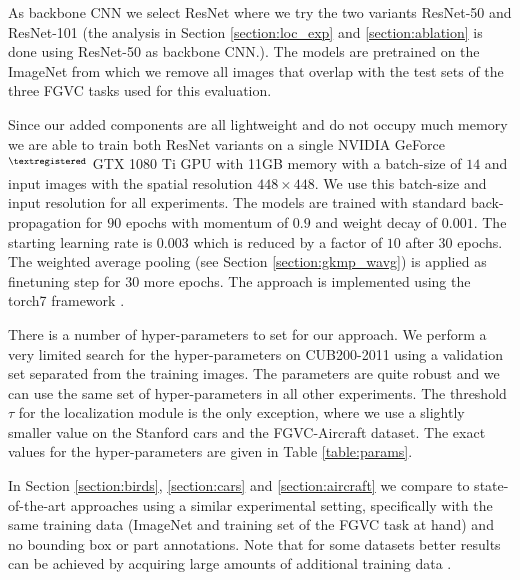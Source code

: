 \documentclass[10pt,twocolumn,letterpaper]{article}
\begin{document}
As backbone CNN we select ResNet \cite{he2016deep} where we try the two variants ResNet-50 and ResNet-101 (the analysis in Section \ref{section:loc_exp} and \ref{section:ablation} is done using ResNet-50 as backbone CNN.). The models are pretrained on the ImageNet \cite{deng2009imagenet} from which we remove all images that overlap with the test sets of the three FGVC tasks used for this evaluation.

Since our added components are all lightweight and do not occupy much memory we are able to train both ResNet variants on a single NVIDIA GeForce$^{\textregistered}$ GTX 1080 Ti GPU with 11GB memory with a batch-size of $14$ and input images with the spatial resolution $448 \times 448$. We use this batch-size and input resolution for all experiments. The models are trained with standard back-propagation for $90$ epochs with momentum of $0.9$ and weight decay of $0.001$. The starting learning rate is $0.003$ which is reduced by a factor of $10$ after $30$ epochs. The weighted average pooling (see Section \ref{section:gkmp_wavg}) is applied as finetuning step for $30$ more epochs. The approach is implemented using the torch7 framework \cite{collobert2011torch7}.

There is a number of hyper-parameters to set for our approach. We perform a very limited search for the hyper-parameters on CUB200-2011 using a validation set separated from the training images. The parameters are quite robust and we can use the same set of hyper-parameters in all other experiments. The threshold $\tau$ for the localization module is the only exception, where we use a slightly smaller value on the Stanford cars and the FGVC-Aircraft dataset. The exact values for the hyper-parameters are given in Table \ref{table:params}.

In Section \ref{section:birds}, \ref{section:cars} and \ref{section:aircraft} we compare to state-of-the-art approaches using a similar experimental setting, specifically with the same training data (ImageNet and training set of the FGVC task at hand) and no bounding box or part annotations. Note that for some datasets better results can be achieved by acquiring large amounts of additional training data \cite{cui2018large,krause2016unreasonable}. 
\end{document}
